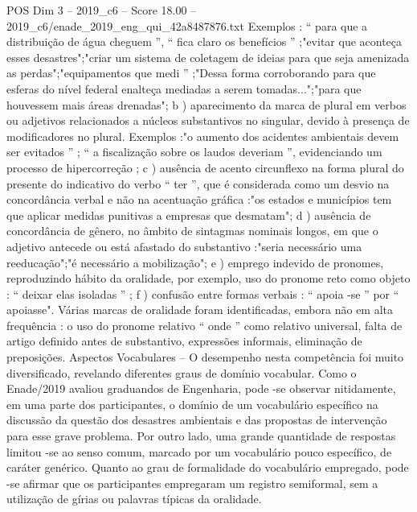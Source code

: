 \begin{textsample}{POS Dim 3 – 2019\_c6 – Score 18.00 – 2019\_c6/enade\_2019\_eng\_qui\_42a8487876.txt}
Exemplos : “ para que a distribuição de água cheguem ”, “ fica claro os benefícios ” ;"evitar que aconteça esses desastres";"criar um sistema de coletagem de ideias para que seja amenizada as perdas";"equipamentos que medi ” ;"Dessa forma corroborando para que esferas do nível federal enalteça mediadas a serem tomadas...";"para que houvessem mais áreas drenadas"; b ) aparecimento da marca de plural em verbos ou adjetivos relacionados a núcleos substantivos no singular, devido à presença de modificadores no plural.
Exemplos :"o aumento dos acidentes ambientais devem ser evitados ” ; “ a fiscalização sobre os laudos deveriam ”, evidenciando um processo de hipercorreção ; c ) ausência de acento circunflexo na forma plural do presente do indicativo do verbo “ ter ”, que é considerada como um desvio na concordância verbal e não na acentuação gráfica :"os estados e municípios tem que aplicar medidas punitivas a empresas que desmatam"; d ) ausência de concordância de gênero, no âmbito de sintagmas nominais longos, em que o adjetivo antecede ou está afastado do substantivo :"seria necessário uma reeducação";"é necessário a mobilização"; e ) emprego indevido de pronomes, reproduzindo hábito da oralidade, por exemplo, uso do pronome reto como objeto : “ deixar elas isoladas ” ; f ) confusão entre formas verbais : “ apoia -se ” por “ apoiasse".
Várias marcas de oralidade foram identificadas, embora não em alta frequência : o uso do pronome relativo “ onde ” como relativo universal, falta de artigo definido antes de substantivo, expressões informais, eliminação de preposições.
Aspectos Vocabulares – O desempenho nesta competência foi muito diversificado, revelando diferentes graus de domínio vocabular.
Como o Enade/2019 avaliou graduandos de Engenharia, pode -se observar nitidamente, em uma parte dos participantes, o domínio de um vocabulário específico na discussão da questão dos desastres ambientais e das propostas de intervenção para esse grave problema.
Por outro lado, uma grande quantidade de respostas limitou -se ao senso comum, marcado por um vocabulário pouco específico, de caráter genérico.
Quanto ao grau de formalidade do vocabulário empregado, pode -se afirmar que os participantes empregaram um registro semiformal, sem a utilização de gírias ou palavras típicas da oralidade.

\end{textsample}
